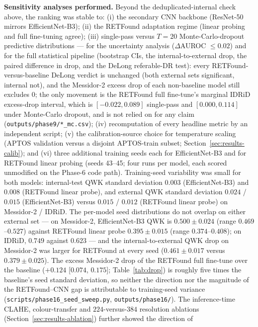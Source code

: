 \documentclass[journal]{IEEEtran}
\begin{document}
\textbf{Sensitivity analyses performed.} Beyond the deduplicated-internal check
above, the ranking was stable to: (i) the secondary CNN backbone (ResNet-50
mirrors EfficientNet-B3); (ii) the RETFound adaptation regime (linear probing and
full fine-tuning agree); (iii) single-pass versus $T=20$ Monte-Carlo-dropout
predictive distributions --- for the uncertainty analysis ($\Delta$AUROC
$\leq 0.02$) and for the full statistical pipeline (bootstrap CIs, the
internal-to-external drop, the paired difference in drop, and the DeLong
referable-DR test): every RETFound-versus-baseline DeLong verdict is unchanged
(both external sets significant, internal not), and the Messidor-2 excess drop of
each non-baseline model still excludes $0$; the only movement is the RETFound
full fine-tune's marginal IDRiD excess-drop interval, which is
$[-0.022, 0.089]$ single-pass and $[0.000, 0.114]$ under Monte-Carlo dropout, and
is not relied on for any claim (\texttt{outputs/phase9/*\_mc.csv});
(iv) recomputation of every headline metric by an independent script; (v) the
calibration-source choice for temperature scaling (APTOS validation versus a
disjoint APTOS-train subset; Section~\ref{sec:results-calib}); and (vi) three
additional training seeds each for EfficientNet-B3 and for RETFound linear
probing (seeds 43--45; four runs per model, each scored unmodified on the
Phase-6 code path). Training-seed variability was small for both models:
internal-test QWK standard deviation $0.003$ (EfficientNet-B3) and $0.008$
(RETFound linear probe), and external QWK standard deviation $0.024$ / $0.015$
(EfficientNet-B3) versus $0.015$ / $0.012$ (RETFound linear probe) on
Messidor-2 / IDRiD. The per-model seed distributions do not overlap on either
external set --- on Messidor-2, EfficientNet-B3 QWK is $0.500 \pm 0.024$
(range $0.469$--$0.527$) against RETFound linear probe $0.395 \pm 0.015$
(range $0.374$--$0.408$); on IDRiD, $0.749$ against $0.623$ --- and the
internal-to-external QWK drop on Messidor-2 was larger for RETFound at every
seed ($0.461 \pm 0.017$ versus $0.379 \pm 0.025$). The excess Messidor-2 drop
of the RETFound full fine-tune over the baseline ($+0.124$ [$0.074$, $0.175$];
Table~\ref{tab:drop}) is roughly five times the baseline's seed standard
deviation, so neither the direction nor the magnitude of the RETFound--CNN gap
is attributable to training-seed variance
(\texttt{scripts/phase16\_seed\_sweep.py}, \texttt{outputs/phase16/}). The
inference-time CLAHE, colour-transfer and $224$-versus-$384$ resolution
ablations (Section~\ref{sec:results-ablation}) further showed the direction of
\end{document}
